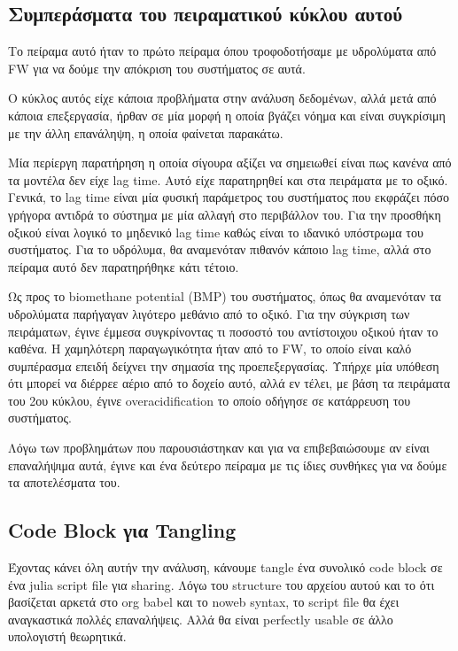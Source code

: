\documentclass[11pt]{article}
\begin{document}
\subsection{Συμπεράσματα του πειραματικού κύκλου αυτού}
\label{sec:orgc8b49d1}
Το πείραμα αυτό ήταν το πρώτο πείραμα όπου τροφοδοτήσαμε με υδρολύματα από FW για να δούμε την απόκριση του συστήματος σε αυτά.

Ο κύκλος αυτός είχε κάποια προβλήματα στην ανάλυση δεδομένων, αλλά μετά από κάποια επεξεργασία, ήρθαν σε μία μορφή η οποία βγάζει νόημα και είναι συγκρίσιμη με την άλλη επανάληψη, η οποία φαίνεται παρακάτω.

Μία περίεργη παρατήρηση η οποία σίγουρα αξίζει να σημειωθεί είναι πως κανένα από τα μοντέλα δεν είχε lag time. Αυτό είχε παρατηρηθεί και στα πειράματα με το οξικό. Γενικά, το lag time είναι μία φυσική παράμετρος του συστήματος που εκφράζει πόσο γρήγορα αντιδρά το σύστημα με μία αλλαγή στο περιβάλλον του. Για την προσθήκη οξικού είναι λογικό το μηδενικό lag time καθώς είναι το ιδανικό υπόστρωμα του συστήματος. Για το υδρόλυμα, θα αναμενόταν πιθανόν κάποιο lag time, αλλά στο πείραμα αυτό δεν παρατηρήθηκε κάτι τέτοιο.

Ως προς το biomethane potential (BMP) του συστήματος, όπως θα αναμενόταν τα υδρολύματα παρήγαγαν λιγότερο μεθάνιο από το οξικό. Για την σύγκριση των πειράματων, έγινε έμμεσα συγκρίνοντας τι ποσοστό του αντίστοιχου οξικού ήταν το καθένα. Η χαμηλότερη παραγωγικότητα ήταν από το FW, το οποίο είναι καλό συμπέρασμα επειδή δείχνει την σημασία της προεπεξεργασίας. Υπήρχε μία υπόθεση ότι μπορεί να διέρρεε αέριο από το δοχείο αυτό, αλλά εν τέλει, με βάση τα πειράματα του 2ου κύκλου, έγινε overacidification το οποίο οδήγησε σε κατάρρευση του συστήματος.

Λόγω των προβλημάτων που παρουσιάστηκαν και για να επιβεβαιώσουμε αν είναι επαναλήψιμα αυτά, έγινε και ένα δεύτερο πείραμα με τις ίδιες συνθήκες για να δούμε τα αποτελέσματα του.

\subsection{Code Block για Tangling}
\label{sec:orgfb96950}
Έχοντας κάνει όλη αυτήν την ανάλυση, κάνουμε tangle ένα συνολικό code block σε ένα julia script file για sharing. Λόγω του structure του αρχείου αυτού και το ότι βασίζεται αρκετά στο org babel και το noweb syntax, το script file θα έχει αναγκαστικά πολλές επαναλήψεις. Αλλά θα είναι perfectly usable σε άλλο υπολογιστή θεωρητικά.
\end{document}
